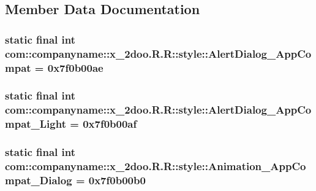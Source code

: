 \subsection{Member Data Documentation}
\hypertarget{classcom_1_1companyname_1_1x__2doo_1_1_r_1_1style_cf3c761853ec79dfbe7bf721bfb46614}{
\subsubsection[{AlertDialog\_\-AppCompat}]{\setlength{\rightskip}{0pt plus 5cm}static final int com::companyname::x\_\-2doo.R.R::style::AlertDialog\_\-AppCompat = 0x7f0b00ae}}
\label{classcom_1_1companyname_1_1x__2doo_1_1_r_1_1style_cf3c761853ec79dfbe7bf721bfb46614}


\hypertarget{classcom_1_1companyname_1_1x__2doo_1_1_r_1_1style_a18855fea60b2d2f602b2613d0fc2020}{
\subsubsection[{AlertDialog\_\-AppCompat\_\-Light}]{\setlength{\rightskip}{0pt plus 5cm}static final int com::companyname::x\_\-2doo.R.R::style::AlertDialog\_\-AppCompat\_\-Light = 0x7f0b00af}}
\label{classcom_1_1companyname_1_1x__2doo_1_1_r_1_1style_a18855fea60b2d2f602b2613d0fc2020}


\hypertarget{classcom_1_1companyname_1_1x__2doo_1_1_r_1_1style_aceacb9acc5c73e10229db659251865f}{
\subsubsection[{Animation\_\-AppCompat\_\-Dialog}]{\setlength{\rightskip}{0pt plus 5cm}static final int com::companyname::x\_\-2doo.R.R::style::Animation\_\-AppCompat\_\-Dialog = 0x7f0b00b0}}
\label{classcom_1_1companyname_1_1x__2doo_1_1_r_1_1style_aceacb9acc5c73e10229db659251865f}


